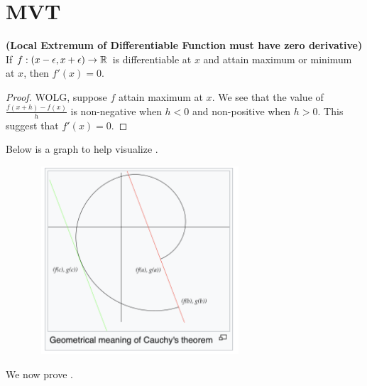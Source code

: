 \documentclass{report}
\begin{document}
\section{MVT}
\begin{abstract}
  This section introduce  and , which will be heavily used later to prove multiple important and  common results, e.g., , ,  and . For how important MVT is in the development of Theory of Calculus, it is worth pointing out that, fundamentally,  relies on the order of the real numbers, as usage of  in the proof of  suggest.
\end{abstract}
\begin{theorem}
\label{LEoDF}
\textbf{(Local Extremum of Differentiable Function must have zero derivative)} If $f:(x-\epsilon ,x+\epsilon )\rightarrow \mathbb{R}$ is differentiable at $x$ and attain maximum or minimum at  $x$, then  $f'(x)=0$. 
\end{theorem}
\begin{proof}
WOLG, suppose $f$ attain maximum at  $x$. We see that the value of $\frac{f(x+h)-f(x)}{h}$ is non-negative when $h<0$ and non-positive when  $h>0$. This suggest that  $f'(x)=0$.
\end{proof}
\begin{mdframed}
Below is a graph to help visualize .
\begin{center}
   \begin{minipage}{0.9\linewidth}  
       \centering       
\includegraphics[height=7cm,width=10cm]{CMVT.png}
   \end{minipage}
\end{center}
We now prove . 
\end{mdframed}
\end{document}
